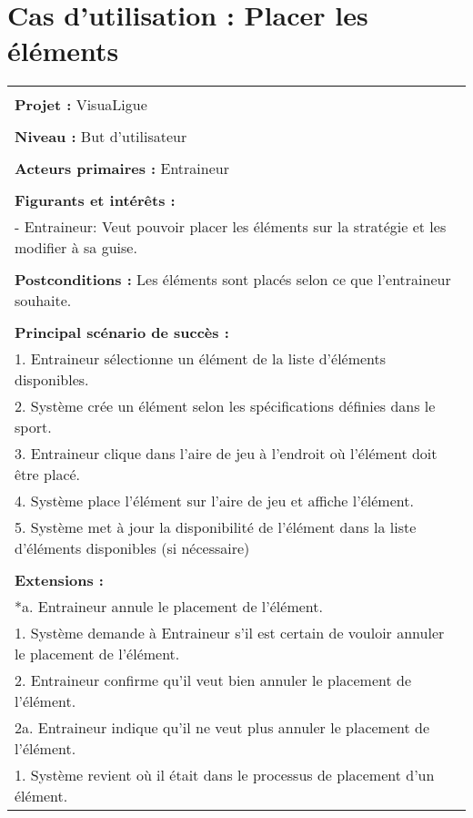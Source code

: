 \section{Cas d'utilisation : Placer les éléments}
\begin{longtable}{|p{16cm}|}
	\hline
	\\
	\textbf{Projet :} VisuaLigue\\
	\\
	\textbf{Niveau :} But d'utilisateur\\
	\\
	\textbf{Acteurs primaires :} Entraineur\\
	\\
	\textbf{Figurants et intérêts :} \\
	- Entraineur: Veut pouvoir placer les éléments sur la stratégie et les modifier à sa guise.\\
	\\
	\textbf{Postconditions :} Les éléments sont placés selon ce que l'entraineur souhaite.\\
	\\
	\textbf{Principal scénario de succès :}\\
	1. Entraineur sélectionne un élément de la liste d'éléments disponibles.\\
	2. Système crée un élément selon les spécifications définies dans le sport.\\
	3. Entraineur clique dans l'aire de jeu à l'endroit où l'élément doit être placé.\\
	4. Système place l'élément sur l'aire de jeu et affiche l'élément.\\
	5. Système met à jour la disponibilité de l'élément dans la liste d'éléments disponibles (si nécessaire)\\
	\\
	\textbf{Extensions :}\\
	*a. Entraineur annule le placement de l'élément.\\
	\hspace{0.5cm}1. Système demande à Entraineur s'il est certain de vouloir annuler le placement de l'élément.\\
	\hspace{0.5cm}2. Entraineur confirme qu'il veut bien annuler le placement de l'élément.\\
	\hspace{1cm}2a. Entraineur indique qu'il ne veut plus annuler le placement de l'élément.\\
	\hspace{1.5cm}1. Système revient où il était dans le processus de placement d'un élément.\\

\end{longtable}
